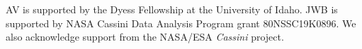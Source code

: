 \documentclass[tighten,linenumbers,twocolumn]{aastex631}
\begin{document}
\begin{acknowledgments}
AV is supported by the Dyess Fellowship at the University of Idaho. JWB is supported by NASA Cassini Data Analysis Program grant 80NSSC19K0896. We also acknowledge support from the NASA/ESA \emph{Cassini} project.
\end{acknowledgments}



\end{document}

